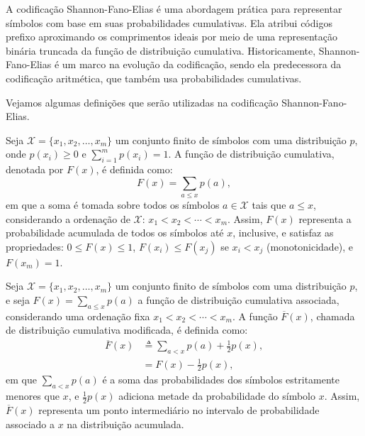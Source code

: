 A codificação Shannon-Fano-Elias é uma abordagem prática para representar
símbolos com base em suas probabilidades cumulativas. Ela atribui códigos
prefixo aproximando os comprimentos ideais por meio de uma representação
binária truncada da função de distribuição cumulativa. Historicamente,
Shannon-Fano-Elias é um marco na evolução da codificação, sendo ela
predecessora da codificação aritmética, que também usa probabilidades
cumulativas. 

Vejamos algumas definições que serão utilizadas na codificação Shannon-Fano-Elias.
\begin{definition}
Seja $\mathcal{X} = \{x_1, x_2, \ldots, x_m\}$ um conjunto finito de símbolos 
com uma distribuição $p$, onde $p(x_i) \geq 0$ e $\sum_{i=1}^m p(x_i) = 1$.
A função de distribuição cumulativa, denotada por $F(x)$, é definida como:
\begin{equation}
F(x) = \sum_{a \leq x} p(a),
\end{equation}
em que a soma é tomada sobre todos os símbolos $a \in \mathcal{X}$ 
tais que $a \leq x$, considerando a ordenação de $\mathcal{X}$: 
$x_1 < x_2 < \cdots < x_m$. Assim, $F(x)$ representa a probabilidade acumulada
de todos os símbolos até $x$, inclusive, e satisfaz as propriedades: $0 \leq F(x) \leq 1$,
$F(x_i) \leq F(x_j)$ se $x_i < x_j$ (monotonicidade), e $F(x_m) = 1$. 
\end{definition}


\begin{definition}
Seja $\mathcal{X} = \{x_1, x_2, \ldots, x_m\}$ um conjunto finito de símbolos
com uma distribuição $p$, e seja $F(x) = \sum_{a \leq x} p(a)$ a função de
distribuição cumulativa associada, considerando uma ordenação fixa $x_1 < x_2 <
\cdots < x_m$. A função $\overline{F}(x)$, chamada de distribuição cumulativa
modificada, é definida como:
\begin{subequations}
\begin{align}
\overline{F}(x) &\triangleq \sum_{a < x} p(a) + \frac{1}{2} p(x), \\
&= F(x) - \frac{1}{2} p(x),
\end{align}
\end{subequations}
em que $\sum_{a < x} p(a)$ é a soma das probabilidades dos símbolos
estritamente menores que $x$, e $\frac{1}{2} p(x)$ adiciona metade da
probabilidade do símbolo $x$. Assim, $\overline{F}(x)$ representa um ponto
intermediário no intervalo de probabilidade associado a $x$ na distribuição
acumulada.
\end{definition}

